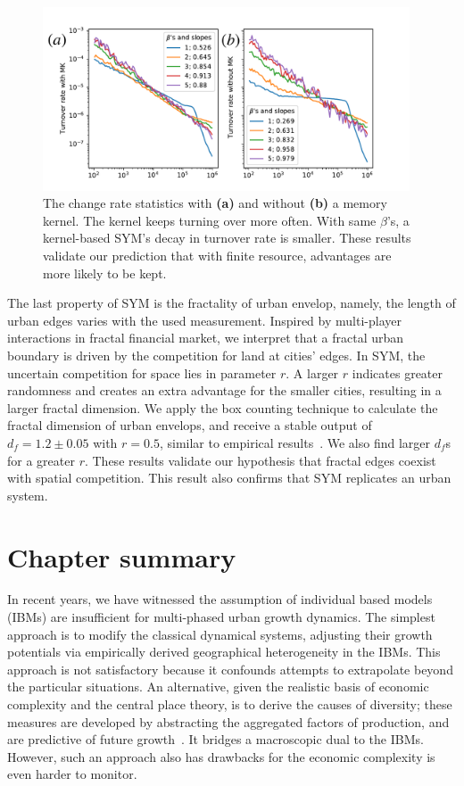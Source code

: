 \begin{figure}
	\centering
	\includegraphics[width = 0.97\textwidth]{Pics/switchrate.pdf}
	\caption{The change rate statistics with \textbf{(a)} and without \textbf{(b)} a memory kernel. The kernel keeps turning over more often. With same $\beta$'s, a kernel-based SYM's decay in turnover rate is smaller. These results validate our prediction that with finite resource, advantages are more likely to be kept.}
	\label{changerate}
\end{figure}

The last property of SYM is the fractality of urban envelop, namely, the length of urban edges varies with the used measurement. Inspired by multi-player interactions in fractal financial market\cite{PhysRevE.65.037106}, we interpret that a fractal urban boundary is driven by the competition for land at cities' edges. In SYM, the uncertain competition for space lies in parameter $r$. A larger $r$ indicates greater randomness and creates an extra advantage for the smaller cities, resulting in a larger fractal dimension. We apply the box counting technique to calculate the fractal dimension of urban envelops, and receive a stable output of $d_f = 1.2\pm 0.05$ with $r = 0.5$, similar to empirical results~\cite{batty1992form}. We also find larger $d_f$s for a greater $r$. These results validate our hypothesis that fractal edges coexist with spatial competition. This result also confirms that SYM replicates an urban system.

\section{Chapter summary}

In recent years, we have witnessed the assumption of individual based models (IBMs) are insufficient for multi-phased urban growth dynamics. The simplest approach is to modify the classical dynamical systems, adjusting their growth potentials via empirically derived geographical heterogeneity in the IBMs. This approach is not satisfactory because it confounds attempts to extrapolate beyond the particular situations. An alternative, given the realistic basis of economic complexity and the central place theory, is to derive the causes of diversity; these measures are developed by abstracting the aggregated factors of production, and are predictive of future growth~\cite{Hidalgo10570}. It bridges a macroscopic dual to the IBMs. However, such an approach also has drawbacks for the economic complexity is even harder to monitor. 

